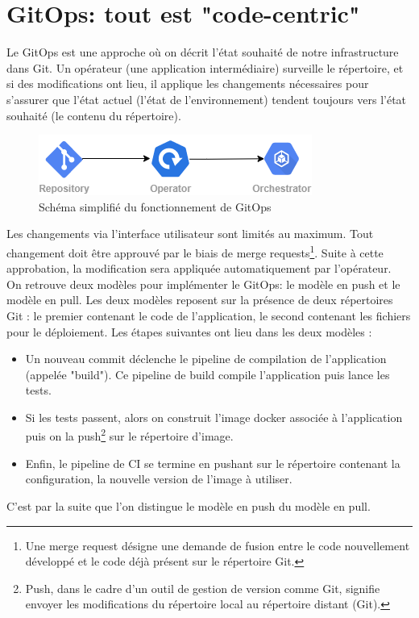 \documentclass[11pt,fleqn]{book} %
\begin{document}
\section{GitOps: tout est "code-centric"}
Le GitOps est une approche où on décrit l’état souhaité de notre infrastructure dans Git. Un opérateur (une application intermédiaire) surveille le répertoire, et si des modifications ont lieu, il applique les changements nécessaires pour s’assurer que l'état actuel (l’état de l’environnement) tendent toujours vers l’état souhaité (le contenu du répertoire). 

\begin{figure}[H]\centering
\renewcommand{\figurename}{Schéma}
\includegraphics[scale=0.8]{Pictures/CI-CD/gitops-Intro.png}
\captionsetup{margin=1.5cm,format=hang,justification=justified}
\caption[]{Schéma simplifié du fonctionnement de GitOps \newline}
\end{figure}

Les changements via l’interface utilisateur sont limités au maximum. Tout changement doit être approuvé par le biais de merge requests\footnote{Une merge request désigne une demande de fusion entre le code nouvellement développé et le code déjà présent sur le répertoire Git.}. Suite à cette approbation, la modification sera appliquée automatiquement par l’opérateur.\\

On retrouve deux modèles pour implémenter le GitOps: le modèle en push et le modèle en pull. Les deux modèles reposent sur la présence de deux répertoires Git : le premier contenant le code de l'application, le second contenant les fichiers pour le déploiement. Les étapes suivantes ont lieu dans les deux modèles : 
\begin{itemize}
     \item Un nouveau commit déclenche le pipeline de compilation de l'application (appelée "build"). Ce pipeline de build compile l'application puis lance les tests.
    \item Si les tests passent, alors on construit l'image docker associée à l'application puis on la push\footnote{Push, dans le cadre d'un outil de gestion de version comme Git, signifie envoyer les modifications du répertoire local au répertoire distant (Git).} sur le répertoire d'image.
    \item Enfin, le pipeline de CI se termine en pushant sur le répertoire contenant la configuration, la nouvelle version de l'image à utiliser.
\end{itemize}
C'est par la suite que l'on distingue le modèle en push du modèle en pull.
\end{document}
